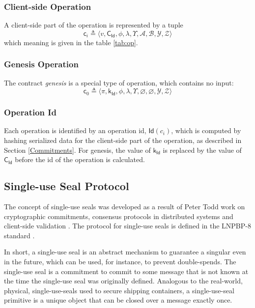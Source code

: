 \documentclass[9pt,oneside]{amsart}
\begin{document}
\begin{multicols}{2}

\subsubsection{Client-side Operation}

A client-side part of the operation is represented by a tuple
\noindent
\begin{equation}
\mathsf{c}_i \triangleq \langle v, \mathsf{C_{Id}}, \phi, \lambda, \Upsilon, \mathcal{A}, \mathcal{B}, \mathcal{Y}, \mathcal{Z} \rangle
\end{equation}
\noindent
which meaning is given in the table \ref{tab:op}.

\subsubsection{Genesis Operation}

The contract \emph{genesis} is a special type of operation, which contains no input:
\noindent
\begin{equation}
\mathsf{c}_0 \triangleq \langle \pi, \mathsf{k_{Id}}, \phi, \lambda, \Upsilon, \varnothing, \varnothing, \mathcal{Y}, \mathcal{Z} \rangle
\end{equation}

\subsubsection{Operation Id}

Each operation is identified by an operation id, $\mathsf{Id}(c_i)$, which is computed by
hashing serialized data for the client-side part of the operation,
as described in Section \ref{Commitments}. For genesis, the value of $\mathsf{k_{Id}}$
is replaced by the value of $\mathsf{C_{Id}}$ before the id of the operation is calculated.


\subsection{Single-use Seal Protocol}\label{SUS}

The concept of single-use seals was developed
as a result of Peter Todd work on cryptographic commitments,
consensus protocols in distributed systems and client-side validation \cite{SUS1, SUS2, SUS3, SUS4}.
The protocol for single-use seals is defined in the LNPBP-8 standard \cite{LNPBP8}.

In short, a single-use seal is an abstract mechanism to guarantee a singular even in the future,
which can be used, for instance, to prevent double-spends.
The single-use seal is a commitment to commit to some message that is not known
at the time the single-use seal was originally defined.
Analogous to the real-world, physical, single-use-seals used to secure shipping containers,
a single-use-seal primitive is a unique object that can be closed over a message exactly once.


\end{multicols}
\end{document}

